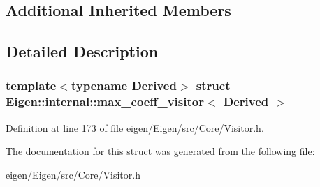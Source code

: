 \subsection*{Additional Inherited Members}


\subsection{Detailed Description}
\subsubsection*{template$<$typename Derived$>$\newline
struct Eigen\+::internal\+::max\+\_\+coeff\+\_\+visitor$<$ Derived $>$}



Definition at line \hyperlink{eigen_2_eigen_2src_2_core_2_visitor_8h_source_l00173}{173} of file \hyperlink{eigen_2_eigen_2src_2_core_2_visitor_8h_source}{eigen/\+Eigen/src/\+Core/\+Visitor.\+h}.



The documentation for this struct was generated from the following file\+:\begin{DoxyCompactItemize}
\item 
eigen/\+Eigen/src/\+Core/\+Visitor.\+h\end{DoxyCompactItemize}
